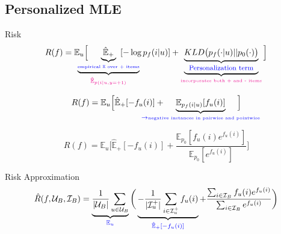 \documentclass{beamer}
\newcommand{\E}{\mathbb{E}}
\begin{document}
\subsection{Personalized MLE}


\begin{frame}
\begin{block}{Risk} \vspace{-4mm}
$$R(f) = \E_u\Big[\hspace{-5mm} \underbrace{\underbrace{\hat{\E}_+}_{\color{blue} \text{\tiny{empirical $\E$ over + items}}}}_{\color{magenta} \hat{\E}_{p(i|u, y=+1)}} \hspace{-8mm}[-\log p_f(i|u)] + \underbrace{\underbrace{KLD\big(p_f(\cdot |u) || p_0(\cdot)\big)}_{\color{blue} \text{\footnotesize{Personalization term}}}}_{\color{magenta} \text{\tiny {incorporates both + and - items}}}\Big]$$ \pause \vspace{-5mm}

$$R(f) = \E_u\Big[\hat{\E}_+[-f_u(i)] + \hspace{-10mm} \underbrace{\E_{p_f(i|u)} [f_u(i)]}_{\color{blue} \to \text{\tiny negative instances in pairwise and pointwise}}\hspace{-10mm}\Big]$$  \pause \vspace{-5mm}

$$R(f) = \E_u\Big[\hat{\E}_+[-f_u(i)] + \frac{\E_{p_0}[f_u(i) e^{f_u(i)}]}{\E_{p_0}[e^{f_u(i)}]}\Big]$$ \pause \vspace{-3mm}

\end{block} 
\begin{block}{Risk Approximation}  \vspace{-8mm}
$$\hat{R}(f, {\cal{U}}_B, {\cal{I}}_B) = 
\underbrace{\frac{1}{|{\cal{U}}_B|} \sum_{u \in {\cal{U}}_B}}_{\color{blue} \E_u} \bigg(\underbrace{- \frac{1}{|{\cal{I}}_u^+|} \sum_{i \in {\cal{I}}_u^+} f_u(i)}_{\color{blue} \hat{\E}_+[-f_u(i)]} + \frac{\sum_{i \in {\cal I}_B} f_u(i) e^{f_u(i)}}{\sum_{i \in {\cal I}_B} e^{f_u(i)}}\bigg)$$
\end{block} 
\end{frame}
\end{document}
